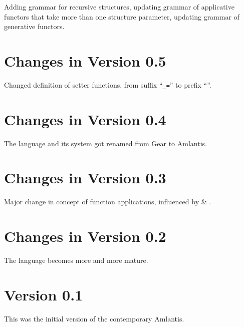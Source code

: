 Adding grammar for recursive structures, updating grammar of applicative functors that take more than one structure parameter, updating grammar of generative functors.  

\section*{Changes in Version 0.5}

Changed definition of setter functions, from suffix ``\lstinline!_=!'' to prefix ``''. 

\section*{Changes in Version 0.4}

The language and its system got renamed from Gear to Amlantis. 

\section*{Changes in Version 0.3}

Major change in concept of function applications, influenced by  \& . 

\section*{Changes in Version 0.2}

The language becomes more and more mature.

\section*{Version 0.1}

This was the initial version of the contemporary Amlantis. 
